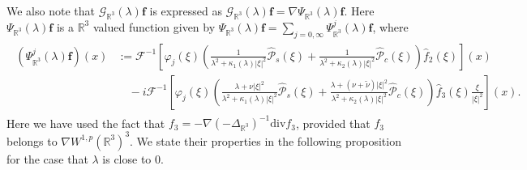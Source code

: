 \documentclass[dvipdfmx,12pt]{article}
\begin{document}
We also note that $\mathcal{G}_{\mathbb{R}^3}(\lambda)\mathbf{f}$ is expressed as $\mathcal{G}_{\mathbb{R}^3}(\lambda)\mathbf{f}=\nabla\Psi_{\mathbb{R}^3}(\lambda)\mathbf{f}$. Here $\Psi_{\mathbb{R}^3}(\lambda)\mathbf{f}$ is a $\mathbb{R}^3$ valued function given by $\Psi_{\mathbb{R}^3}(\lambda)\mathbf{f}=\sum_{j=0,\infty}\Psi_{\mathbb{R}^3}^j(\lambda)\mathbf{f}$, where
\begin{gather}
\label{R-R3-psi-j}
\begin{aligned}
(\Psi_{\mathbb{R}^3}^j (\lambda)\mathbf{f})(x)
&:=\mathcal{F}^{-1}\left[\varphi_j(\xi)\left(\frac{1}{\lambda^2+\kappa_1(\lambda)|\xi|^2}\widehat{\mathcal{P}}_s(\xi)+\frac{1}{\lambda^2+\kappa_2(\lambda)|\xi|^2}\widehat{\mathcal{P}}_c(\xi)\right)\widehat{f}_2(\xi)\right](x)\\
&\quad -i\mathcal{F}^{-1}\left[\varphi_j(\xi)\left(\frac{\lambda+\nu|\xi|^2}{\lambda^2+\kappa_1(\lambda)|\xi|^2}\widehat{\mathcal{P}}_s(\xi)+\frac{\lambda+(\nu+\tilde{\nu})|\xi|^2}{\lambda^2+\kappa_2(\lambda)|\xi|^2}\widehat{\mathcal{P}}_c(\xi)\right)\widehat{f}_3(\xi)\frac{\xi}{|\xi|^2}\right](x).
\end{aligned}
\end{gather}
Here we have used the fact that $f_3=-\nabla(-\Delta_{\mathbb{R}^3})^{-1}\mathrm{div}f_3$, provided that $f_3$ belongs to $\nabla W^{1,p}(\mathbb{R}^3)^3$. We state their properties in the following proposition for the case that $\lambda$ is close to $0$.
\end{document}
